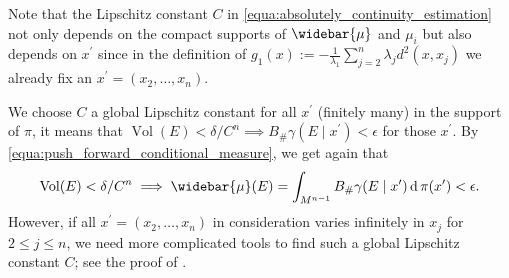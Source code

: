 \begin{rmk}
	\label{rmk:global_Lipschitz_constant}
	Note that the Lipschitz constant $C$ in \cref{equa:absolutely_continuity_estimation}
	not only depends on the compact supports of $\widebar{\mu}$ and $\mu_i$
	but also depends on $x^\prime$
	since in the definition of $g_1(x):=- \frac{1}{\lambda_1}\sum_{j=2}^n \lambda_j d^2(x, x_j)$
	we already fix an $x^\prime = (x_2, \ldots, x_n)$.

	We choose $C$ a global Lipschitz constant for all $x^\prime$ (finitely many) in the support of $\pi$,
	it means that $\operatorname{Vol}(E) < \delta /C^n \implies B_{\#} \gamma(E \mid x^\prime) < \epsilon$
	for those $x^\prime$.
	By \cref{equa:push_forward_conditional_measure}, we get again that
	\[
		\operatorname{Vol}(E) < \delta / C^n \implies \widebar{\mu}(E)
		= \int_{M^{n-1}} B_{\#}\gamma(E \mid x^\prime) \diff \pi(x^\prime) < \epsilon.
	\]
	However, if all $x^\prime = (x_2, \ldots, x_n)$ in consideration varies infinitely
	in $x_j$ for $2 \leq j \leq n$,
	we need more complicated tools to find such a global Lipschitz constant $C$;
	see the proof of .
\end{rmk}

